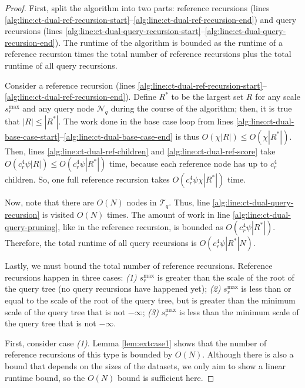 \begin{proof}
First, split the algorithm into two parts: reference recursions (lines
\ref{alg:line:ct-dual-ref-recursion-start}--\ref{alg:line:ct-dual-ref-recursion-end})
and query recursions (lines
\ref{alg:line:ct-dual-query-recursion-start}--\ref{alg:line:ct-dual-query-recursion-end}).
The runtime of the algorithm is bounded as the runtime of a reference recursion
times the total number of reference recursions plus the total runtime of all
query recursions.

Consider a reference recursion (lines
\ref{alg:line:ct-dual-ref-recursion-start}--\ref{alg:line:ct-dual-ref-recursion-end}).
Define $R^*$ to be the largest set $R$ for any scale
$s_r^{\max}$ and any query node $\mathscr{N}_q$ during the course of the
algorithm; then, it is true that $| R | \le | R^* |$.  The work done in the base
case loop from lines
\ref{alg:line:ct-dual-base-case-start}--\ref{alg:line:ct-dual-base-case-end} is
thus $O(\chi | R |) \le O(\chi | R^*|)$.
%
Then, lines \ref{alg:line:ct-dual-ref-children} and
\ref{alg:line:ct-dual-ref-score} take $O(c_r^4 \psi | R |) \le O(c_r^4 \psi |
R^* |)$ time, because each reference node has up to $c_r^4$ children.  So, one
full reference recursion takes $O(c_r^4 \psi \chi | R^* |)$ time.

Now, note that there are $O(N)$ nodes in $\mathscr{T}_q$.  Thus, line
\ref{alg:line:ct-dual-query-recursion} is visited $O(N)$ times.  The amount of
work in line \ref{alg:line:ct-dual-query-pruning}, like in the reference
recursion, is bounded as $O(c_r^4 \psi | R^* |)$. Therefore, the total runtime
of all query recursions is $O(c_r^4 \psi | R^* | N)$.

Lastly, we must bound the total number of reference recursions.  Reference
recursions happen in three cases: \textit{(1)} $s_r^{\max}$ is greater than the
scale of the root of the query tree (no query recursions have happened yet);
\textit{(2)} $s_r^{\max}$ is less than or equal to the scale of the root of the
query tree, but is greater than the minimum scale of the query tree that is not
$-\infty$; \textit{(3)} $s_r^{\max}$ is less than the minimum scale of the query
tree that is not $-\infty$.

First, consider case \textit{(1)}.  Lemma \ref{lem:extcase1} shows that the
number of reference recursions of this type is bounded by $O(N)$.  Although
there is also a bound that depends on the sizes of the datasets, we only aim to
show a linear runtime bound, so the $O(N)$ bound is sufficient here.


\end{proof}
